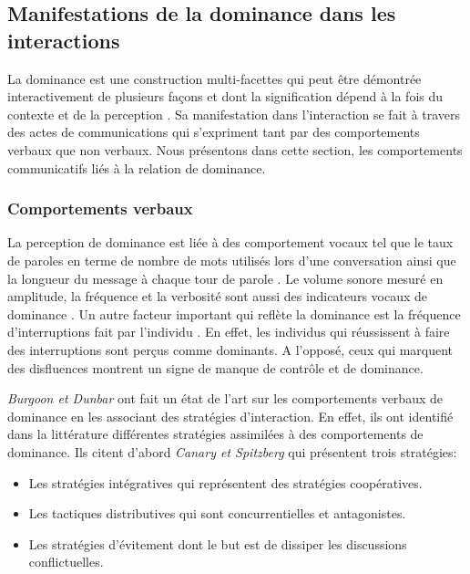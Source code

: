 		
	\subsection{Manifestations de la dominance dans les interactions}
	\label{sec:manifesationDom}
		La dominance est une construction multi-facettes qui peut être démontrée interactivement de plusieurs façons et dont la signification dépend à la fois du contexte et de la perception \cite{dunbar2005perceptions}. Sa manifestation dans l'interaction se fait à travers des actes de communications qui s'expriment tant par des comportements verbaux que non verbaux.
		Nous présentons dans cette section, les comportements communicatifs liés à la relation de dominance. 
		
		\subsubsection{Comportements verbaux}
			La perception de dominance est liée à des comportement vocaux tel que le taux de paroles en terme de nombre de mots utilisés lors d'une conversation ainsi que la longueur du message à chaque tour de parole \cite{dunbar2005perceptions}. Le volume sonore mesuré en amplitude, la fréquence et la verbosité sont aussi des indicateurs vocaux de dominance \cite{dunbar2005perceptions}. 
			Un autre facteur important qui reflète la dominance est la fréquence d'interruptions fait par l'individu \cite{dunbar2005perceptions,hall2005nonverbal}. En effet, les individus qui réussissent à faire des interruptions sont perçus comme dominants. A l'opposé, ceux qui marquent des disfluences montrent un signe de manque de contrôle et de dominance. 

			\emph{Burgoon et Dunbar} \cite{dunbar2005perceptions} ont fait un état de l'art sur les comportements verbaux de dominance en les associant des stratégies d'interaction. En effet, ils ont identifié dans la littérature différentes stratégies assimilées à des comportements de dominance. Ils citent d'abord \emph{Canary et Spitzberg} \cite{canary1987} qui présentent trois stratégies: 
			\begin{itemize}
				\item Les stratégies intégratives qui représentent des stratégies coopératives.
				\item Les tactiques distributives qui sont concurrentielles et antagonistes.
				\item Les stratégies d'évitement dont le but est de dissiper les discussions conflictuelles. 
			\end{itemize}
			
